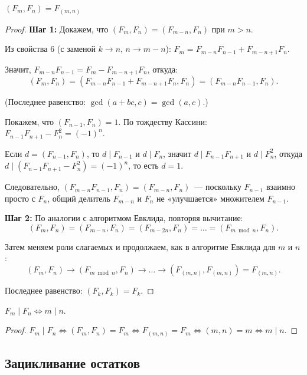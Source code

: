 \documentclass[12pt]{article}
\begin{document}
	\begin{theorem}
		$(F_m, F_n) = F_{(m, n)}$
	\end{theorem}
	
	\begin{proof}
		\textbf{Шаг 1:} Докажем, что $(F_m, F_n) = (F_{m-n}, F_n)$ при $m > n$.
		
		Из свойства 6 (с заменой $k \to n$, $n \to m - n$): $F_m = F_{m-n} F_{n-1} + F_{m-n+1} F_n$.
		
		Значит, $F_{m-n} F_{n-1} = F_m - F_{m-n+1} F_n$, откуда:
		\[(F_m, F_n) = (F_{m-n} F_{n-1} + F_{m-n+1} F_n, F_n) = (F_{m-n} F_{n-1}, F_n).\]
		
		(Последнее равенство: $\gcd(a + bc, c) = \gcd(a, c)$.)
		
		Покажем, что $(F_{n-1}, F_n) = 1$. По тождеству Кассини: $F_{n-1} F_{n+1} - F_n^2 = (-1)^n$.
		
		Если $d = (F_{n-1}, F_n)$, то $d \mid F_{n-1}$ и $d \mid F_n$, значит $d \mid F_{n-1} F_{n+1}$ и $d \mid F_n^2$, откуда $d \mid (F_{n-1} F_{n+1} - F_n^2) = (-1)^n$, то есть $d = 1$.
		
		Следовательно, $(F_{m-n} F_{n-1}, F_n) = (F_{m-n}, F_n)$~--- поскольку $F_{n-1}$ взаимно просто с $F_n$, общий делитель $F_{m-n}$ и $F_n$ не «улучшается» множителем $F_{n-1}$.
		
		\textbf{Шаг 2:} По аналогии с алгоритмом Евклида, повторяя вычитание:
		\[(F_m, F_n) = (F_{m-n}, F_n) = (F_{m-2n}, F_n) = \dots = (F_{m \bmod n}, F_n).\]
		
		Затем меняем роли слагаемых и продолжаем, как в алгоритме Евклида для $m$ и $n$:
		\[(F_m, F_n) \to (F_{m \bmod n}, F_n) \to \dots \to (F_{(m,n)}, F_{(m,n)}) = F_{(m,n)}.\]
		
		Последнее равенство: $(F_k, F_k) = F_k$.
	\end{proof}
	
	\begin{corollary}
		$F_m \mid F_n \Leftrightarrow m \mid n$.
	\end{corollary}
	
	\begin{proof}
		$F_m \mid F_n \Leftrightarrow (F_m, F_n) = F_m \Leftrightarrow F_{(m,n)} = F_m \Leftrightarrow (m, n) = m \Leftrightarrow m \mid n$.
	\end{proof}
	
	\subsection{Зацикливание остатков}
	
\end{document}
